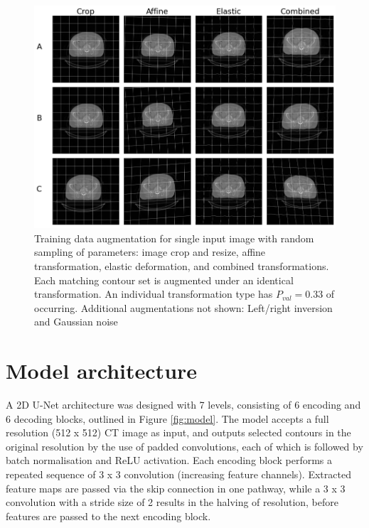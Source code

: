 \begin{figure}[H]
	\begin{center}
		\includegraphics[width=1\textwidth]{figures/augment}
		\caption{Training data augmentation for single input image with random sampling of parameters: image crop and resize, affine transformation, elastic deformation, and combined transformations. Each matching contour set is augmented under an identical transformation. An individual transformation type has $P_{val}=0.33$ of occurring. Additional augmentations not shown: Left/right inversion and Gaussian noise}
		\label{fig:augment}
	\end{center}
\end{figure}

\section{Model architecture}
\label{ch:method-architecture}
A 2D U-Net architecture was designed  with 7 levels, consisting of 6 encoding and 6 decoding blocks, outlined in Figure \ref{fig:model}. The model accepts a full resolution (512 x 512) CT image as input, and outputs selected contours in the original resolution by the use of padded convolutions, each of which is followed by batch normalisation and ReLU activation. Each encoding block performs a repeated sequence of 3 x 3 convolution (increasing feature channels). Extracted feature maps are passed via the skip connection in one pathway, while a 3 x 3 convolution with a stride size of 2 results in the halving of resolution, before features are passed to the next encoding block.

